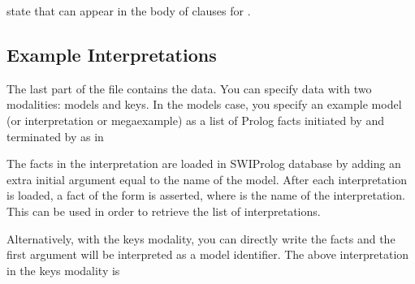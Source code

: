 \documentclass[letterpaper,10pt,english]{sphinxmanual}
\begin{document}
\sphinxAtStartPar
state that  can appear in the body of clauses for .


\subsection{Example Interpretations}
\label{\detokenize{index:example-interpretations}}
\sphinxAtStartPar
The last part of the file contains the data.
You can specify data with two modalities: models and keys.
In the models case, you specify an example model (or interpretation or mega\sphinxhyphen{}example) as a list of Prolog facts initiated by  and terminated by  as in

\begin{sphinxVerbatim}[commandchars=\\\{\}]
\end{sphinxVerbatim}

\sphinxAtStartPar
The facts in the interpretation are loaded in SWI\sphinxhyphen{}Prolog database by adding an extra initial argument equal to the name of the model.
After each interpretation is loaded, a fact of the form  is asserted, where  is the name of the interpretation.
This can be used in order to retrieve the list of interpretations.

\sphinxAtStartPar
Alternatively, with the keys modality, you can directly write the facts and the first argument will be interpreted as a model identifier.
The above interpretation in the keys modality is
\end{document}
